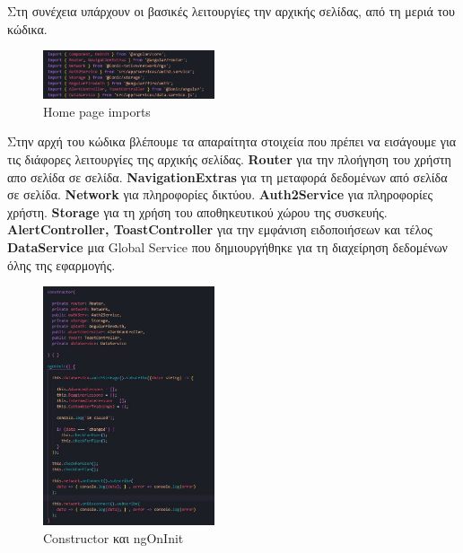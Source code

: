 \documentclass[a4paper,12pt]{article}
\begin{document}
			Στη συνέχεια υπάρχουν οι βασικές λειτουργίες την αρχικής σελίδας, από τη μεριά του κώδικα.
			\vspace*{1cm}

			\begin{figure}
				\caption{Home page imports}
				\vspace*{0.5cm}

				\includegraphics[width=0.45\textwidth]{homeImports}	
			\end{figure}
			
			Στην αρχή του κώδικα βλέπουμε τα απαραίτητα στοιχεία που πρέπει να εισάγουμε για τις διάφορες λειτουργίες της αρχικής σελίδας. \textbf{Router} για την πλοήγηση του χρήστη απο σελίδα σε σελίδα. 
			\textbf{NavigationExtras} για τη μεταφορά δεδομένων από σελίδα σε σελίδα.
			\textbf{Network} για πληροφορίες δικτύου. \textbf{Auth2Service} για πληροφορίες χρήστη. \textbf{Storage} για τη χρήση του αποθηκευτικού 
			χώρου της συσκευής. \textbf{AlertController, ToastController} για την εμφάνιση ειδοποιήσεων και τέλος \textbf{DataService} μια Global 
			Service που δημιουργήθηκε για τη διαχείρηση δεδομένων όλης της εφαρμογής.
			\vspace*{1cm}

			\begin{figure}
				\caption{Constructor και ngOnInit}
				\vspace*{0.5cm}

				\includegraphics[width=0.45\textwidth]{homInit}	
			\end{figure}
\end{document}
